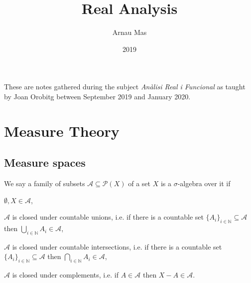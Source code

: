 \documentclass[12pt,oneside]{book}
\title{Real Analysis}
\author{Arnau Mas}
\date{2019}
\numberwithin{table}{section}
\numberwithin{equation}{section}
\numberwithin{figure}{section}
\newcommand{\N}{\mathbb{N}}
\newcommand{\A}{\mathcal{A}}
\renewcommand{\P}{\mathcal{P}}
\begin{document}
\maketitle

\frontmatter
\pagestyle{plain}
These are notes gathered during the subject \emph{Anàlisi Real i Funcional} as taught by Joan Orobitg between September 2019 and January 2020.

\mainmatter

\chapter{Measure Theory}
\section{Measure spaces}
\begin{defn}
	We say a family of subsets \( \A \subseteq \P(X) \) of a set \( X \) is a \( \sigma \)-algebra over it if
	\begin{points}
	\item \( \emptyset, X \in \A \),
	\item \( \A \) is closed under countable unions, i.e. if there is a countable set \( \{ A_i \}_{i \in \N} \subseteq \A \) then \( \bigcup_{i \in \N} A_i \in \A \),
	\item \( \A \) is closed under countable intersections, i.e. if there is a countable set \( \{ A_i \}_{i \in \N} \subseteq \A \) then \( \bigcap_{i \in \N} A_i \in \A \),
	\item \( \A \) is closed under complements, i.e. if \( A \in \A \) then \( X - A \in \A \).
	\end{points}
\end{defn}
\end{document}

